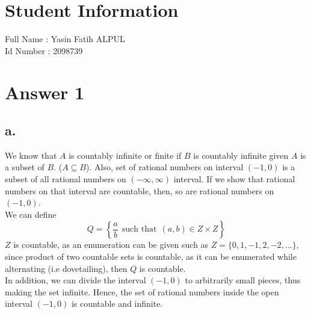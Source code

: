 \documentclass[12pt]{article}
\begin{document}
\section*{Student Information } 
Full Name :  Yasin Fatih ALPUL\\
Id Number :  2098739\\

\section*{Answer 1}

\subsection*{a.}
We know that $A$ is countably infinite or finite if $B$ is countably infinite given $A$ is a subset of $B$. ($A \subseteq B$). Also, set of rational numbers on interval $(-1,0)$ is a subset of all rational numbers on $(-\infty,\infty)$ interval. If we show that rational numbers on that interval are countable, then, so are rational numbers on $(-1,0)$.\\
We can define\\
$$Q = \left\{\frac{a}{b} ~~\text{such that}~~(a,b) \in Z\times Z\right\}$$
$Z$ is countable, as an enumeration can be given such as $Z=\{0,1,-1,2,-2,\dots \}$, since product of two countable sets is countable, as it can be enumerated while alternating (i.e dovetailing), then $Q$ is countable.\\
In addition, we can divide the interval $(-1,0)$ to arbitrarily small pieces, thus making the set infinite. Hence, the set of rational numbers inside the open interval $(-1,0)$ is countable and infinite.
\end{document}

